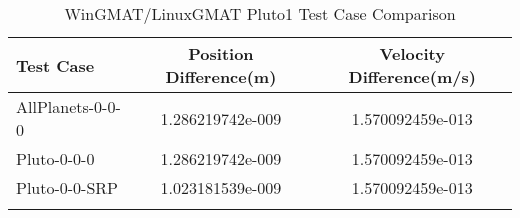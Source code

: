 \begin{table}[htbp!]
\centering
\caption{ WinGMAT/LinuxGMAT Pluto1 Test Case Comparison}
      \begin{tabular}{lcc}
      \hline\hline
          Test Case & Position Difference(m) & Velocity Difference(m/s) \\
         \hline
         AllPlanets-0-0-0 & 1.286219742e-009 & 1.570092459e-013 \\
         Pluto-0-0-0 & 1.286219742e-009 & 1.570092459e-013 \\
         Pluto-0-0-SRP & 1.023181539e-009 & 1.570092459e-013 \\
      \hline\hline
      \label{Table: Pluto1 WinGMAT-LinuxGMAT Table} 
\end{tabular}
\end{table}
